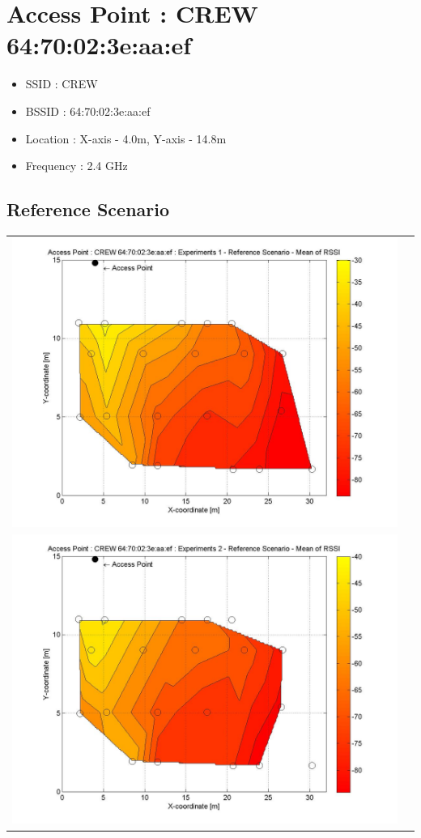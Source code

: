 \documentclass[11pt,a4paper,headinclude,footinclude,chapterprefix=on]{scrreprt}
\begin{document}
\begin{longtable}
\end{longtable}
\section{Access Point : CREW 64:70:02:3e:aa:ef} 
\begin{itemize}
	\item SSID : CREW 
	\item BSSID : 64:70:02:3e:aa:ef 
	\item Location : X-axis - 4.0m, Y-axis - 14.8m 
	\item Frequency : 2.4 GHz 
\end{itemize}
\subsection{Reference Scenario} 
\begin{longtable}
	{lr} 
	\includegraphics[width=13cm]{../../Source/plot/CREW_ef/ef_Ref_Ex_1_Mean.jpg} \\
	\includegraphics[width=13cm]{../../Source/plot/CREW_ef/ef_Ref_Ex_2_Mean.jpg} \\

\end{longtable}
\end{document}
